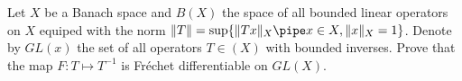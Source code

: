 Let $X$ be a Banach space and $B(X)$ the space of all bounded linear
operators on $X$ equiped with the norm $\|T\|=\sup\{\|Tx\|_{X}\pipe
x\in X,\|x\|_{X}=1\}$. Denote by $GL(x)$ the set of all operators
$T\in (X)$ with bounded inverses. Prove that the map $F:T\mapsto
T^{-1}$ is Fr\'echet differentiable on $GL(X)$.
